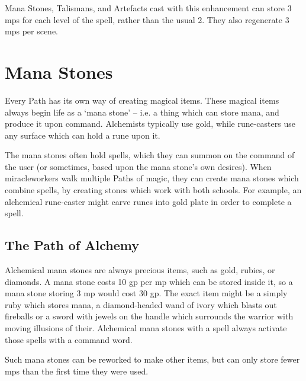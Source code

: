 \begin{multicols}{2}
\spelllevel


Mana Stones, Talismans, and Artefacts cast with this enhancement can store 3 \glspl{mp} for each level of the spell, rather than the usual 2.
They also regenerate 3 \glspl{mp} per scene.

\end{multicols}

\section{Mana Stones}

\begin{multicols}{2}

\noindent
Every Path has its own way of creating magical items.
These magical items always begin life as a `mana stone' -- i.e. a thing which can store mana, and produce it upon command.
Alchemists typically use gold, while rune-casters use any surface which can hold a rune upon it.

The mana stones often hold spells, which they can summon on the command of the user (or sometimes, based upon the mana stone's own desires).
When \glspl{miracleworker} walk multiple Paths of magic, they can create mana stones which combine spells, by creating stones which work with both schools.
For example, an alchemical rune-caster might carve runes into gold plate in order to complete a spell.

\subsection{The Path of Alchemy}


Alchemical mana stones are always precious items, such as gold, rubies, or diamonds.
A mana stone costs 10 gp per \gls{mp} which can be stored inside it, so a mana stone storing 3 \gls{mp} would cost 30 gp.
The exact item might be a simply ruby which stores mana, a diamond-headed wand of ivory which blasts out fireballs or a sword with jewels on the handle which surrounds the warrior with moving illusions of their.
Alchemical mana stones with a spell always activate those spells with a command word.

Such mana stones can be reworked to make other items, but can only store fewer \glspl{mp} than the first time they were used.


\end{multicols}
